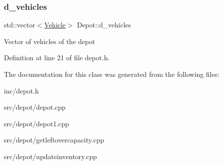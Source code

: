 \subsubsection{\texorpdfstring{d\+\_\+vehicles}{d\_vehicles}}
{\footnotesize\ttfamily std\+::vector$<$\hyperlink{class_vehicle}{Vehicle}$>$ Depot\+::d\+\_\+vehicles\hspace{0.3cm}{\ttfamily [private]}}

Vector of vehicles of the depot 

Definition at line 21 of file depot.\+h.



The documentation for this class was generated from the following files\+:\begin{DoxyCompactItemize}
\item 
inc/depot.\+h\item 
src/depot/depot.\+cpp\item 
src/depot/depot1.\+cpp\item 
src/depot/getleftovercapacity.\+cpp\item 
src/depot/updateinventory.\+cpp\end{DoxyCompactItemize}
